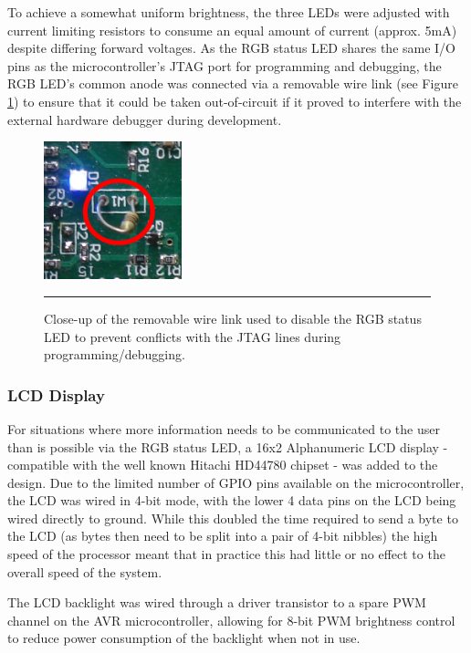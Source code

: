 To achieve a somewhat uniform brightness, the three LEDs were adjusted with current limiting resistors to consume an equal amount of current (approx. 5mA) despite differing forward voltages. As the RGB status LED shares the same I/O pins as the microcontroller's JTAG port for programming and debugging, the RGB LED's common anode was connected via a removable wire link (see Figure \ref{fig:rgbwirelink}) to ensure that it could be taken out-of-circuit if it proved to interfere with the external hardware debugger during development.

\begin{figure}[tbph]
	\centering
		\includegraphics[width=40mm]{./Figures/RGBWireLink.png}
	\rule{35em}{0.5pt}
	\caption[Close-up of the RGB LED's Removable Wire Link]{Close-up of the removable wire link used to disable the RGB status LED to prevent conflicts with the JTAG lines during programming/debugging.}
	\label{fig:rgbwirelink}
\end{figure}

\FloatBarrier
\subsubsection{LCD Display}

For situations where more information needs to be communicated to the user than is possible via the RGB status LED, a 16x2 Alphanumeric LCD display - compatible with the well known Hitachi HD44780 chipset - was added to the design. Due to the limited number of GPIO pins available on the microcontroller, the LCD was wired in 4-bit mode, with the lower 4 data pins on the LCD being wired directly to ground. While this doubled the time required to send a byte to the LCD (as bytes then need to be split into a pair of 4-bit nibbles) the high speed of the processor meant that in practice this had little or no effect to the overall speed of the system.

The LCD backlight was wired through a driver transistor to a spare PWM channel on the AVR microcontroller, allowing for 8-bit PWM brightness control to reduce power consumption of the backlight when not in use.

